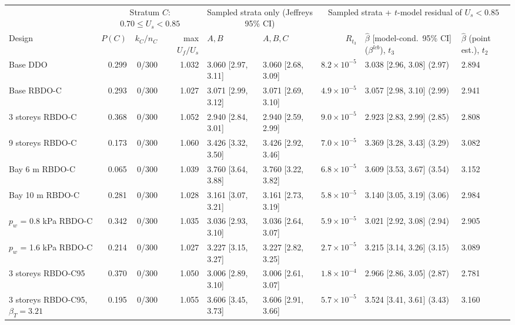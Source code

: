 \begin{tabular}{lrrrllrll}
\toprule
 & \multicolumn{3}{c}{Stratum $C$: $0.70\leq U_s<0.85$} & \multicolumn{2}{c}{Sampled strata only (Jeffreys 95\% CI)} & \multicolumn{3}{c}{Sampled strata + $t$-model residual of $U_s<0.85$} \\
\cmidrule(lr){2-4}\cmidrule(lr){5-6}\cmidrule(lr){7-9}
Design & $P(C)$ & $k_C/n_C$ & max $U_f/U_s$ & $A,B$ & $A,B,C$ & $R_{t_3}$ & $\hat\beta$ [model-cond.\ 95\% CI] ($\beta^{lcb}$), $t_3$ & $\hat\beta$ (point est.), $t_2$ \\
\midrule
Base DDO & 0.299 & 0/300 & 1.032 & 3.060 [2.97, 3.11] & 3.060 [2.68, 3.09] & $8.2\times10^{-5}$ & 3.038 [2.96, 3.08] (2.97) & 2.894 \\
Base RBDO-C & 0.293 & 0/300 & 1.027 & 3.071 [2.99, 3.12] & 3.071 [2.69, 3.10] & $4.9\times10^{-5}$ & 3.057 [2.98, 3.10] (2.99) & 2.941 \\
3 storeys RBDO-C & 0.368 & 0/300 & 1.052 & 2.940 [2.84, 3.01] & 2.940 [2.59, 2.99] & $9.0\times10^{-5}$ & 2.923 [2.83, 2.99] (2.85) & 2.808 \\
9 storeys RBDO-C & 0.173 & 0/300 & 1.060 & 3.426 [3.32, 3.50] & 3.426 [2.92, 3.46] & $7.0\times10^{-5}$ & 3.369 [3.28, 3.43] (3.29) & 3.082 \\
Bay 6 m RBDO-C & 0.065 & 0/300 & 1.039 & 3.760 [3.64, 3.88] & 3.760 [3.22, 3.82] & $6.8\times10^{-5}$ & 3.609 [3.53, 3.67] (3.54) & 3.152 \\
Bay 10 m RBDO-C & 0.281 & 0/300 & 1.028 & 3.161 [3.07, 3.21] & 3.161 [2.73, 3.19] & $5.8\times10^{-5}$ & 3.140 [3.05, 3.19] (3.06) & 2.984 \\
$p_w$ = 0.8 kPa RBDO-C & 0.342 & 0/300 & 1.035 & 3.036 [2.93, 3.10] & 3.036 [2.64, 3.07] & $5.9\times10^{-5}$ & 3.021 [2.92, 3.08] (2.94) & 2.905 \\
$p_w$ = 1.6 kPa RBDO-C & 0.214 & 0/300 & 1.027 & 3.227 [3.15, 3.27] & 3.227 [2.82, 3.25] & $2.7\times10^{-5}$ & 3.215 [3.14, 3.26] (3.15) & 3.089 \\
3 storeys RBDO-C95 & 0.370 & 0/300 & 1.050 & 3.006 [2.89, 3.10] & 3.006 [2.61, 3.07] & $1.8\times10^{-4}$ & 2.966 [2.86, 3.05] (2.87) & 2.781 \\
3 storeys RBDO-C95, $\beta_T=3.21$ & 0.195 & 0/300 & 1.055 & 3.606 [3.45, 3.73] & 3.606 [2.91, 3.66] & $5.7\times10^{-5}$ & 3.524 [3.41, 3.61] (3.43) & 3.160 \\
\bottomrule
\end{tabular}